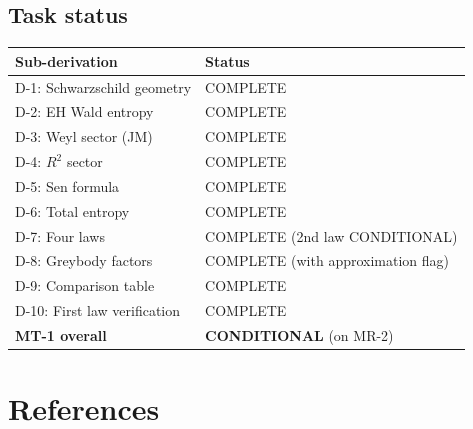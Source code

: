 \documentclass[11pt,a4paper]{article}
\theoremstyle{plain}
\theoremstyle{definition}
\begin{document}
\subsection{Task status}

\begin{center}
\begin{tabular}{ll}
\toprule
Sub-derivation & Status \\
\midrule
D-1: Schwarzschild geometry & COMPLETE \\
D-2: EH Wald entropy & COMPLETE \\
D-3: Weyl sector (JM) & COMPLETE \\
D-4: $R^2$ sector & COMPLETE \\
D-5: Sen formula & COMPLETE \\
D-6: Total entropy & COMPLETE \\
D-7: Four laws & COMPLETE (2nd law CONDITIONAL) \\
D-8: Greybody factors & COMPLETE (with approximation flag) \\
D-9: Comparison table & COMPLETE \\
D-10: First law verification & COMPLETE \\
\midrule
\textbf{MT-1 overall} & \textbf{CONDITIONAL} (on MR-2) \\
\bottomrule
\end{tabular}
\end{center}


\section*{References}
\end{document}
